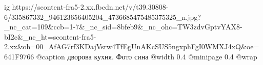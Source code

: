  
 
 
 
 

\ifcmt
  ig https://scontent-fra5-2.xx.fbcdn.net/v/t39.30808-6/335867332_946123656405204_4736685475485375325_n.jpg?_nc_cat=109&ccb=1-7&_nc_sid=8bfeb9&_nc_ohc=TW3zdvGptvYAX8-bI2c&_nc_ht=scontent-fra5-2.xx&oh=00_AfAG7rf3KDajVsrw4TfEgUnAKcSUS5ngxphFgI0WMXJ4xQ&oe=641F9766
  @caption дворова кухня. Фото сина
  @width 0.4
  @minipage 0.4
  @wrap \parpic[r]
\fi
